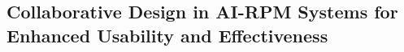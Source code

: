 











\subsection{Collaborative Design in AI-RPM Systems for Enhanced Usability and Effectiveness}

